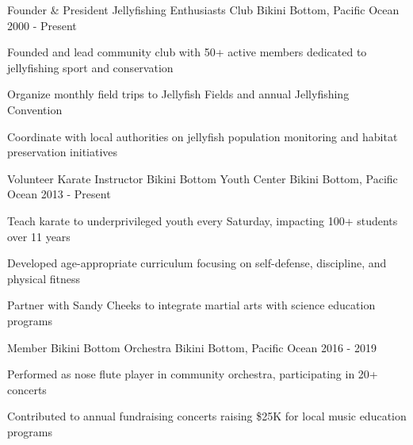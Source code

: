 \begin{cventries}

  \cventry
    {Founder \& President} %
    {Jellyfishing Enthusiasts Club} %
    {Bikini Bottom, Pacific Ocean} %
    {2000 - Present} %
    {
      \begin{cvitems}
        \item {Founded and lead community club with 50+ active members dedicated to jellyfishing sport and conservation}
        \item {Organize monthly field trips to Jellyfish Fields and annual Jellyfishing Convention}
        \item {Coordinate with local authorities on jellyfish population monitoring and habitat preservation initiatives}
      \end{cvitems}
    }

  \cventry
    {Volunteer Karate Instructor} %
    {Bikini Bottom Youth Center} %
    {Bikini Bottom, Pacific Ocean} %
    {2013 - Present} %
    {
      \begin{cvitems}
        \item {Teach karate to underprivileged youth every Saturday, impacting 100+ students over 11 years}
        \item {Developed age-appropriate curriculum focusing on self-defense, discipline, and physical fitness}
        \item {Partner with Sandy Cheeks to integrate martial arts with science education programs}
      \end{cvitems}
    }

  \cventry
    {Member} %
    {Bikini Bottom Orchestra} %
    {Bikini Bottom, Pacific Ocean} %
    {2016 - 2019} %
    {
      \begin{cvitems}
        \item {Performed as nose flute player in community orchestra, participating in 20+ concerts}
        \item {Contributed to annual fundraising concerts raising \$25K for local music education programs}
      \end{cvitems}
    }

\end{cventries}
